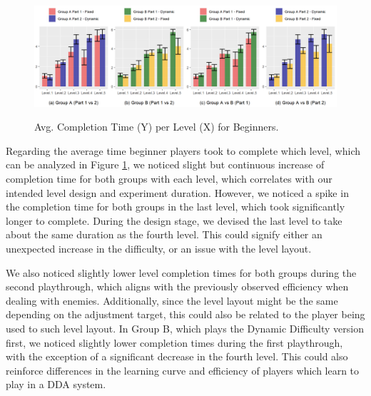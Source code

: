 \begin{figure}[ht]
    \begin{center}
    \caption{Avg. Completion Time (Y) per Level (X) for Beginners.}
        \includegraphics[width=\textwidth]{figures/completion_time-beginner_players.png}
        \label{fig:result-metric-beginners-completion-time}
    \end{center}
\end{figure}

Regarding the average time beginner players took to complete which level, which can be analyzed in Figure \ref{fig:result-metric-beginners-completion-time}, we noticed slight but continuous increase of completion time for both groups with each level, which correlates with our intended level design and experiment duration. However, we noticed a spike in the completion time for both groups in the last level, which took significantly longer to complete. During the design stage, we devised the last level to take about the same duration as the fourth level. This could signify either an unexpected increase in the difficulty, or an issue with the level layout.

We also noticed slightly lower level completion times for both groups during the second playthrough, which aligns with the previously observed efficiency when dealing with enemies. Additionally, since the level layout might be the same depending on the adjustment target, this could also be related to the player being used to such level layout. In Group B, which plays the Dynamic Difficulty version first, we noticed slightly lower completion times during the first playthrough, with the exception of a significant decrease in the fourth level. This could also reinforce differences in the learning curve and efficiency of players which learn to play in a DDA system.

